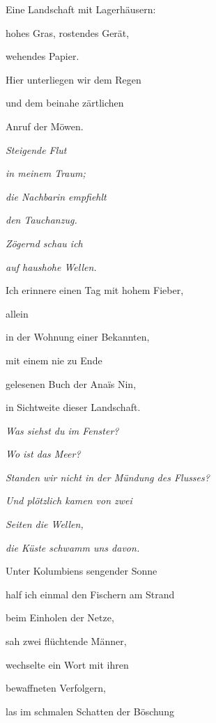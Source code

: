 \documentclass[a4paper]{article}
\begin{document}
Eine Landschaft mit Lagerhäusern:

hohes Gras, rostendes Gerät,

wehendes Papier.


\bigskip

Hier unterliegen wir dem Regen

und dem beinahe zärtlichen

Anruf der Möwen.


\bigskip

{\itshape
Steigende Flut}

{\itshape
in meinem Traum;}

{\itshape
die Nachbarin empfiehlt }

{\itshape
den Tauchanzug.}

{\itshape
Zögernd schau ich }

{\itshape
auf haushohe Wellen.}


\bigskip

Ich erinnere einen Tag mit hohem Fieber, 

allein

in der Wohnung einer Bekannten,


\bigskip

mit einem nie zu Ende

gelesenen Buch der Anaïs Nin,

in Sichtweite dieser Landschaft.


\bigskip

{\itshape
Was siehst du im Fenster?}

{\itshape
Wo ist das Meer?}

{\itshape
Standen wir nicht in der Mündung des Flusses?}

{\itshape
Und plötzlich kamen von zwei}

{\itshape
Seiten die Wellen,}

{\itshape
die Küste schwamm uns davon.}


\bigskip

Unter Kolumbiens sengender Sonne

half ich einmal den Fischern am Strand

beim Einholen der Netze,


\bigskip

sah zwei flüchtende Männer,

wechselte ein Wort mit ihren 

bewaffneten Verfolgern,


\bigskip

las im schmalen Schatten der Böschung
\end{document}
